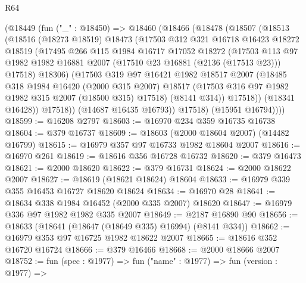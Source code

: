 \begin{lexlean}{R64}
\begin{coremodule}
      (@18449
        (fun ("_" : @18450) =>
        @18460
          (@18466
            (@18478
              (@18507
                (@18513
                  (@18516
                    (@18273 @18519)
                    @18473
                    (@17503
                      @312
                      @321
                      @16718
                      @16423
                      @18272
                      @18519
                      (@17495
                        @266
                        @115
                        @1984
                        @16717
                        @17052
                        @18272
                        (@17503
                          @113
                          @97
                          @1982
                          @1982
                          @16881
                          @2007
                          (@17510 @23 @16881 (@2136 (@17513 @23)))
                          @17518)
                        @18306)
                      (@17503
                        @319
                        @97
                        @16421
                        @1982
                        @18517
                        @2007
                        (@18485
                          @318
                          @1984
                          @16420
                          (@2000 @315 @2007)
                          @18517
                          (@17503 @316 @97 @1982 @1982 @315 @2007 (@18500 @315) @17518)
                          (@8141 @314))
                        @17518))
                    (@18341 @16428))
                  @17518))
              (@14687 @16435 @16793))
            @17518)
          (@15951 @16794))))
@18599 := @16208 @2797
@18603 := @16970 @234 @359 @16735 @16738
@18604 := @379 @16737
@18609 := @18603 (@2000 @18604 @2007) (@14482 @16799)
@18615 := @16979 @357 @97 @16733 @1982 @18604 @2007
@18616 := @16970 @261
@18619 := @18616 @356 @16728 @16732
@18620 := @379 @16473
@18621 := @2000 @18620
@18622 := @379 @16731
@18624 := @2000 @18622 @2007
@18627 := @18619 (@18621 @18624) @18604
@18633 := @16979 @339 @355 @16453 @16727 @18620 @18624
@18634 := @16970 @28
@18641 := @18634 @338 @1984 @16452 (@2000 @335 @2007) @18620
@18647 := @16979 @336 @97 @1982 @1982 @335 @2007
@18649 := @2187 @16890 @90
@18656 := @18633 (@18641 (@18647 (@18649 @335) @16994) (@8141 @334))
@18662 := @16979 @353 @97 @16725 @1982 @18622 @2007
@18665 := @18616 @352 @16720 @16724
@18666 := @379 @16466
@18668 := @2000 @18666 @2007
@18752 := fun (spec : @1977) =>
  fun ("name" : @1977) =>
  fun (version : @1977) =>

\end{coremodule}
\end{lexlean}
